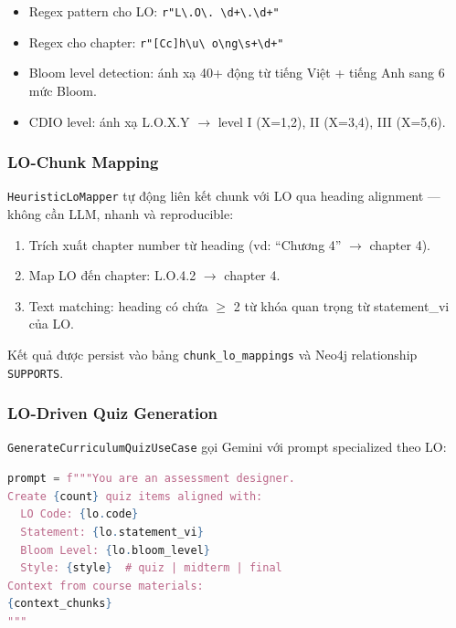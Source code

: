 \begin{itemize}
    \item Regex pattern cho LO: \texttt{r"L\textbackslash.O\textbackslash.
          \textbackslash d+\textbackslash.\textbackslash d+"}
    \item Regex cho chapter: \texttt{r"[Cc]h\textbackslash u\textbackslash
          o\textbackslash ng\textbackslash s+\textbackslash d+"}
    \item Bloom level detection: ánh xạ 40+ động từ
          tiếng Việt + tiếng Anh sang 6 mức Bloom.
    \item CDIO level: ánh xạ L.O.X.Y $\to$ level I (X=1,2),
          II (X=3,4), III (X=5,6).
\end{itemize}

\subsubsection{LO-Chunk Mapping}

\texttt{HeuristicLoMapper} tự động liên kết chunk với LO qua
heading alignment --- không cần LLM, nhanh và reproducible:

\begin{enumerate}
    \item Trích xuất chapter number từ heading (vd: ``Chương 4''
          $\to$ chapter 4).
    \item Map LO đến chapter: L.O.4.2 $\to$ chapter 4.
    \item Text matching: heading có chứa $\geq$ 2 từ khóa
          quan trọng từ statement\_vi của LO.
\end{enumerate}

Kết quả được persist vào bảng \texttt{chunk\_lo\_mappings} và
Neo4j relationship \texttt{SUPPORTS}.

\subsubsection{LO-Driven Quiz Generation}

\texttt{GenerateCurriculumQuizUseCase} gọi Gemini với prompt
specialized theo LO:

\begin{lstlisting}[language=Python, caption={Prompt template cho LO-aligned quiz}]
prompt = f"""You are an assessment designer.
Create {count} quiz items aligned with:
  LO Code: {lo.code}
  Statement: {lo.statement_vi}
  Bloom Level: {lo.bloom_level}
  Style: {style}  # quiz | midterm | final
Context from course materials:
{context_chunks}
"""
\end{lstlisting}

